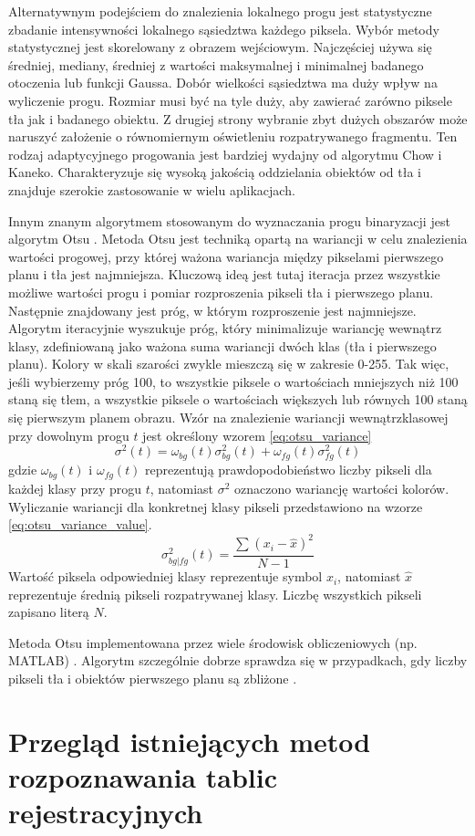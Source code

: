 Alternatywnym podejściem do znalezienia lokalnego progu jest statystyczne zbadanie intensywności lokalnego sąsiedztwa każdego piksela.
Wybór metody statystycznej jest skorelowany z obrazem wejściowym.
Najczęściej używa się średniej, mediany, średniej z wartości maksymalnej i minimalnej badanego otoczenia lub funkcji Gaussa.
Dobór wielkości sąsiedztwa ma duży wpływ na wyliczenie progu.
Rozmiar musi być na tyle duży, aby zawierać zarówno piksele tła jak i badanego obiektu.
Z drugiej strony wybranie zbyt dużych obszarów może naruszyć założenie o równomiernym oświetleniu rozpatrywanego fragmentu.
Ten rodzaj adaptycyjnego progowania jest bardziej wydajny od algorytmu Chow i Kaneko.
Charakteryzuje się wysoką jakością oddzielania obiektów od tła i znajduje szerokie zastosowanie w wielu aplikacjach.

Innym znanym algorytmem stosowanym do wyznaczania progu binaryzacji jest algorytm Otsu \cite{4310076}.
Metoda Otsu jest techniką opartą na wariancji w celu znalezienia wartości progowej, przy której ważona wariancja między pikselami pierwszego planu i tła jest najmniejsza.
Kluczową ideą jest tutaj iteracja przez wszystkie możliwe wartości progu i pomiar rozproszenia pikseli tła i pierwszego planu.
Następnie znajdowany jest próg, w którym rozproszenie jest najmniejsze.
Algorytm iteracyjnie wyszukuje próg, który minimalizuje wariancję wewnątrz klasy, zdefiniowaną jako ważona suma wariancji dwóch klas (tła i pierwszego planu).
Kolory w skali szarości zwykle mieszczą się w zakresie 0-255.
Tak więc, jeśli wybierzemy próg 100, to wszystkie piksele o wartościach mniejszych niż 100 staną się tłem, a wszystkie piksele o wartościach większych lub równych 100 staną się pierwszym planem obrazu.
Wzór na znalezienie wariancji wewnątrzklasowej przy dowolnym progu $t$ jest określony wzorem \ref{eq:otsu_variance}
\begin{equation}
    \label{eq:otsu_variance}
    \sigma^2(t)=\omega_{bg}(t)\sigma_{bg}^2(t)+\omega_{fg}(t)\sigma_{fg}^2(t)
\end{equation}
gdzie $\omega_{bg}(t)$ i $\omega_{fg}(t)$ reprezentują prawdopodobieństwo liczby pikseli dla każdej klasy przy progu $t$, natomiast $\sigma^2$ oznaczono wariancję wartości kolorów.
Wyliczanie wariancji dla konkretnej klasy pikseli przedstawiono na wzorze \ref{eq:otsu_variance_value}.
\begin{equation}
    \label{eq:otsu_variance_value}
    \sigma_{bg | fg}^2(t)=\dfrac{\sum_{}^{}(x_i-\hat{x})^2}{N-1}
\end{equation}
Wartość piksela odpowiedniej klasy reprezentuje symbol $x_i$, natomiast $\hat{x}$ reprezentuje średnią pikseli rozpatrywanej klasy.
Liczbę wszystkich pikseli zapisano literą $N$.

Metoda Otsu implementowana przez wiele środowisk obliczeniowych (np. MATLAB) \cite{otsu_inzynieria_rolnicza}.
Algorytm szczególnie dobrze sprawdza się w przypadkach, gdy liczby pikseli tła i obiektów pierwszego planu są zbliżone \cite{10.1117/1.1631315}.


\section{Przegląd istniejących metod rozpoznawania tablic rejestracyjnych}
